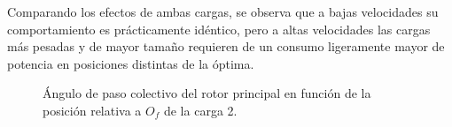 Comparando los efectos de ambas cargas, se observa que a bajas velocidades su comportamiento es prácticamente idéntico, pero a altas velocidades las cargas más pesadas y de mayor tamaño requieren de un consumo ligeramente mayor de potencia en posiciones distintas de la óptima.

\begin{figure}
	\centering
	\caption{Ángulo de paso colectivo del rotor principal en función de la posición relativa a $O_f$ de la carga 2.}
	\label{theta0VH2lxy}
\end{figure}
